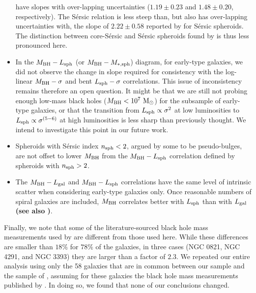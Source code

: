 \documentclass[preprint2]{emulateapj}
\begin{document}
\begin{itemize}
      have slopes with over-lapping uncertainties ($1.19 \pm 0.23$ and $1.48 \pm 0.20$, respectively).  
      The S\'ersic relation is less steep than, but also has over-lapping uncertainties with, 
      the slope of $2.22 \pm 0.58$ reported by \cite{scott2013} for S\'ersic spheroids.  
      The distinction between core-S\'ersic and S\'ersic spheroids found by \cite{scott2013} is thus less pronounced here. 
\item In the $M_{\rm BH} - L_{\rm sph}$ (or $M_{\rm BH} - M_{\rm *,sph}$) diagram, for early-type galaxies, 
      we did not observe the change in slope required for consistency with the log-linear $M_{\rm BH} - \sigma$ and bent $L_{\rm sph} - \sigma$ correlations.
      This issue of inconsistency remains therefore an open question. 
      It might be that we are still not probing enough low-mass black holes ($M_{\rm BH} < 10^7\rm~M_\odot$) 
      for the subsample of early-type galaxies, 
      or that the transition from  $L_{\rm sph} \propto \sigma^2$ at low luminosities to $L_{\rm sph} \propto \sigma^{(5-6)}$ at high luminosities 
      is less sharp than previously thought.
      We intend to investigate this point in our future work. 
\item Spheroids with S\'ersic index $n_{\rm sph}<2$, argued by some to be pseudo-bulges, 
      are not offset to lower $M_{\rm BH}$ from the $M_{\rm BH} - L_{\rm sph}$ correlation defined by spheroids with $n_{\rm sph}>2$. 
\item The $M_{\rm BH} - L_{\rm gal}$ and $M_{\rm BH} - L_{\rm sph}$ correlations have the same level of intrinsic scatter 
      when considering early-type galaxies only. 
      Once reasonable numbers of spiral galaxies are included, 
      $M_{\rm BH}$ correlates better with $L_{\rm sph}$ than with $L_{\rm gal}$ {\bf (see also \citealt{erwingadotti2012,beifiori2012})}. 
\end{itemize} 

Finally, we note that some of the literature-sourced black hole mass measurements used by \cite{kormendyho2013} are different from those used here.  
While these differences are smaller than $18\%$ for $78\%$ of the galaxies, 
in three cases (NGC 0821, NGC 4291, and NGC 3393) they are larger than a factor of $2.3$.  
We repeated our entire analysis using only the 58 galaxies that are in common between our sample and the sample of \cite{kormendyho2013}, 
assuming for these galaxies the black hole mass measurements published by \cite{kormendyho2013}. 
In doing so, we found that none of our conclusions changed.
\end{document}
